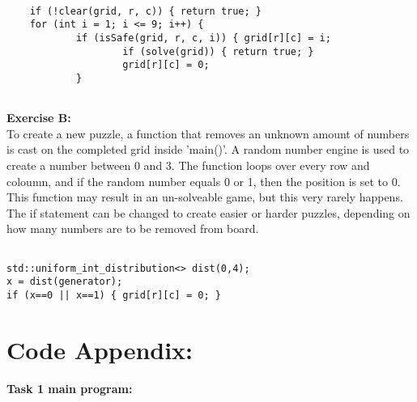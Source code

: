 \documentclass[11pt]{amsart}
\begin{document}
\begin{verbatim}

 	if (!clear(grid, r, c)) { return true; }
 	for (int i = 1; i <= 9; i++) {
 			if (isSafe(grid, r, c, i)) { grid[r][c] = i;
 					if (solve(grid)) { return true; }
 					grid[r][c] = 0;
 			}


\end{verbatim}


\textbf{Exercise B:} \\

To create a new puzzle, a function that removes an unknown amount of numbers is
cast on the completed grid inside 'main()'. A random number engine is used to create a number
between 0 and 3. The function loops over every row and coloumn, and if the random number
equals 0 or 1, then the position is set to 0. \\
This function may result in an un-solveable game, but this very rarely happens. \\
The if statement can be changed to create easier or harder puzzles, depending on how many
numbers are to be removed from board. \\

\begin{verbatim}

std::uniform_int_distribution<> dist(0,4);
x = dist(generator);
if (x==0 || x==1) { grid[r][c] = 0; }

\end{verbatim}

\section{\textbf{Code Appendix:}}

\textbf{Task 1 main program:}
\end{document}
